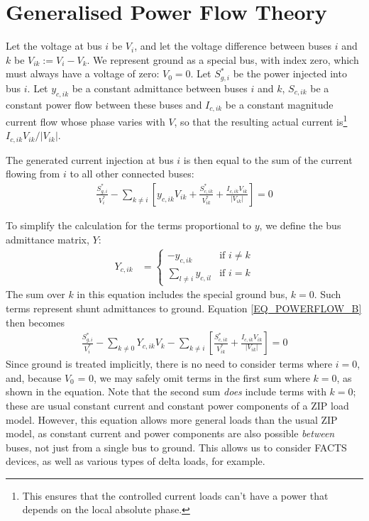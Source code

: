 \documentclass[10pt]{article}
\begin{document}
\section{Generalised Power Flow Theory}
Let the voltage at bus $i$ be $V_i$, and let the voltage difference between buses $i$ and $k$ be $V_{ik} := V_i - V_k$. We represent ground as a special bus, with index zero, which must always have a voltage of zero: $V_0 = 0$. Let $S^*_{g,i}$ be the power injected into bus $i$. Let $y_{c,ik}$ be a constant admittance between buses $i$ and $k$, $S_{c,ik}$ be a constant power flow between these buses and $I_{c,ik}$ be a constant magnitude current flow whose phase varies with $V$, so that the resulting actual current is\footnote{This ensures that the controlled current loads can't have a power that depends on the local absolute phase.} $I_{c,ik}V_{ik}/|V_{ik}|$.

The generated current injection at bus $i$ is then equal to the sum of the current flowing from $i$ to all other connected buses:
\begin{align}
	\frac{S^*_{g,i}}{V^*_i} - \sum_{k \ne i} \left[y_{c,ik}V_{ik} + \frac{S^*_{c,ik}}{V^*_{ik}} + \frac{I_{c,ik}V_{ik}}{|V_{ik}|}\right] = 0
	\label{EQ_POWERFLOW_B}
\end{align}

To simplify the calculation for the terms proportional to $y$, we define the bus admittance matrix, $Y$:
\begin{align}
	Y_{c,ik} &=
		\begin{cases}
			-y_{c,ik}&\text{if $i \ne k$} \\
			\sum_{l \ne i} y_{c,il}& \text{if $i = k$}
		\end{cases}
	\label{EQ_YNODE_OHMIC_B}
\end{align}
The sum over $k$ in this equation includes the special ground bus, $k = 0$. Such terms represent shunt admittances to ground. Equation \ref{EQ_POWERFLOW_B} then becomes
\begin{align}
	\frac{S^*_{g,i}}{V^*_i} - \sum_{k \ne 0}{Y_{c,ik}V_{k}} - \sum_{k \ne i}\left[\frac{S^*_{c,ik}}{V^*_{ik}} + \frac{I_{c,ik}V_{ik}}{|V_{ik}|}\right] = 0
	\label{EQ_POWERFLOW_B1}
\end{align}
Since ground is treated implicitly, there is no need to consider terms where $i = 0$, and, because $V_0$ = 0, we may safely omit terms in the first sum where $k = 0$, as shown in the equation. Note that the second sum \emph{does} include terms with $k = 0$; these are usual constant current and constant power components of a ZIP load model. However, this equation allows more general loads than the usual ZIP model, as constant current and power components are also possible \emph{between} buses, not just from a single bus to ground. This allows us to consider FACTS devices, as well as various types of delta loads, for example.
\end{document}
